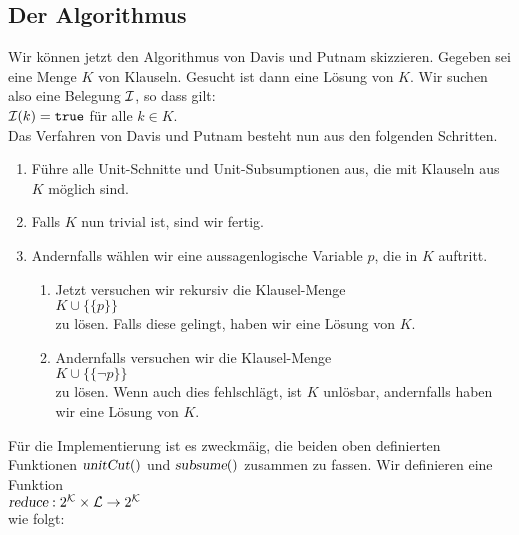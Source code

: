 \subsection{Der Algorithmus}
Wir k\"{o}nnen jetzt den Algorithmus von Davis und Putnam skizzieren.
Gegeben sei eine Menge $K$ von Klauseln.  Gesucht ist dann eine L\"{o}sung von $K$.  Wir
suchen  also eine Belegung $\mathcal{I}$, so dass gilt: \\[0.2cm]
\hspace*{1.3cm} $\mathcal{I}(k) = \mathtt{true}$ \quad f\"{u}r alle $k \in K$.\\[0.2cm]
Das Verfahren von Davis und Putnam besteht nun aus den folgenden Schritten.
\begin{enumerate}
\item F\"{u}hre alle Unit-Schnitte und Unit-Subsumptionen aus, die mit Klauseln aus $K$ m\"{o}glich sind.
\item Falls $K$ nun trivial ist, sind wir fertig.
\item Andernfalls w\"{a}hlen wir eine aussagenlogische Variable $p$, die in $K$ auftritt.
      \begin{enumerate}
      \item Jetzt versuchen  wir rekursiv  die Klausel-Menge \\[0.2cm]
            \hspace*{1.3cm}  $K \cup \bigl\{\{p\}\bigr\}$ \\[0.2cm]
            zu l\"{o}sen. Falls diese gelingt, haben wir eine L\"{o}sung von $K$.
      \item Andernfalls versuchen wir  die Klausel-Menge \\[0.2cm]
            \hspace*{1.3cm} $K \cup \bigl\{\{\neg p\}\bigr\}$ \\[0.2cm]
            zu l\"{o}sen.  Wenn auch dies fehlschl\"{a}gt, ist $K$ unl\"{o}sbar, andernfalls
            haben wir eine L\"{o}sung von $K$.
      \end{enumerate}
\end{enumerate}
F\"{u}r die Implementierung ist es zweckm\"{a}\3ig, die beiden oben definierten Funktionen $\textsl{unitCut}()$ und
$\textsl{subsume}()$ zusammen zu fassen.  Wir definieren eine Funktion
\\[0.2cm]
\hspace*{1.3cm}
$\textsl{reduce}: 2^\mathcal{K} \times \mathcal{L} \rightarrow 2^\mathcal{K}$
\\[0.2cm]
wie folgt: 
\\[0.2cm]
\hspace*{1.3cm}
